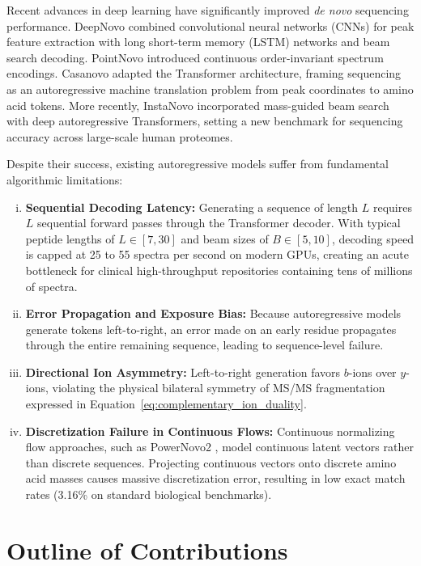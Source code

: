 Recent advances in deep learning have significantly improved \emph{de novo} sequencing performance. DeepNovo \citep{Tran2017} combined convolutional neural networks (CNNs) for peak feature extraction with long short-term memory (LSTM) networks and beam search decoding. PointNovo \citep{Qiao2021} introduced continuous order-invariant spectrum encodings. Casanovo \citep{Yilmaz2022} adapted the Transformer architecture, framing sequencing as an autoregressive machine translation problem from peak coordinates to amino acid tokens. More recently, InstaNovo \citep{Eloff2025} incorporated mass-guided beam search with deep autoregressive Transformers, setting a new benchmark for sequencing accuracy across large-scale human proteomes.

Despite their success, existing autoregressive models suffer from fundamental algorithmic limitations:
\begin{enumerate}[(i)]
\item \textbf{Sequential Decoding Latency:} Generating a sequence of length $L$ requires $L$ sequential forward passes through the Transformer decoder. With typical peptide lengths of $L \in [7, 30]$ and beam sizes of $B \in [5, 10]$, decoding speed is capped at 25 to 55 spectra per second on modern GPUs, creating an acute bottleneck for clinical high-throughput repositories containing tens of millions of spectra.
\item \textbf{Error Propagation and Exposure Bias:} Because autoregressive models generate tokens left-to-right, an error made on an early residue propagates through the entire remaining sequence, leading to sequence-level failure.
\item \textbf{Directional Ion Asymmetry:} Left-to-right generation favors $b$-ions over $y$-ions, violating the physical bilateral symmetry of MS/MS fragmentation expressed in Equation~\ref{eq:complementary_ion_duality}.
\item \textbf{Discretization Failure in Continuous Flows:} Continuous normalizing flow approaches, such as PowerNovo2 \citep{Petrovskiy2026}, model continuous latent vectors rather than discrete sequences. Projecting continuous vectors onto discrete amino acid masses causes massive discretization error, resulting in low exact match rates (3.16\% on standard biological benchmarks).
\end{enumerate}

\section{Outline of Contributions}

